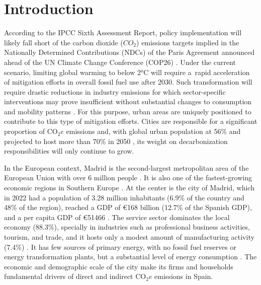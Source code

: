 \documentclass[
  10pt,
  twocolumn]{aft}
\begin{document}
\makeatother
\section{Introduction}\label{sec-introduction}

According to the IPCC Sixth Assessment Report, policy implementation
will likely fall short of the carbon dioxide (\(CO_2\)) emissions
targets implied in the Nationally Determined Contributions (NDCs) of the
Paris Agreement announced ahead of the UN Climate Change Conference
(COP26) \citep{ipcc_summary_2022}. Under the current scenario, limiting
global warming to below 2°C will require a~rapid acceleration of
mitigation efforts in overall fossil fuel use after 2030. Such
transformation will require drastic reductions in industry emissions for
which sector-specific interventions may prove insufficient without
substantial changes to consumption and mobility patterns
\citep{ipcc_summary_2023}. For this purpose, urban areas are uniquely
positioned to contribute to this type of mitigation efforts. Cities are
responsible for a significant proportion of \(\text{CO}_2e\) emissions
\citep{ipcc_climate_2023, wiedmann_city_2021, hoornweg_cities_2011} and,
with global urban population at 56\% and projected to host more than
70\% in 2050 \citep{un_world_2022}, its weight on decarbonization
responsibilities will only continue to grow.

In the European context, Madrid is the second-largest metropolitan area
of the European Union with over 6 million people
\citep{eurostat_population_2024}. It is also one of the fastest-growing
economic regions in Southern Europe \citep{eurostat_gross_2024}. At the
center is the city of Madrid, which in 2022 had a population of 3.28
million inhabitants (6.9\% of the country and 48\% of the region),
reached a GDP of \euro{}168 billion (12.7\% of the Spanish GDP), and a
per capita GDP of \euro{}51466
\citep{am_areas_2023, amMadridEconomia20232023}. The service sector
dominates the local economy (88.3\%), specially in industries such as
professional business activities, tourism, and trade, and it hosts only
a modest amount of manufacturing activity (7.4\%)
\citep{am_areas_2023, am_estructura_2013, amRoadmapClimateNeutrality2022, amMadridEconomia20232023}.
It has few sources of primary energy, with no fossil fuel reserves or
energy transformation plants, but a substantial level of energy
consumption \citep{perez_methodology_2019}. The economic and demographic
scale of the city make its firms and households fundamental drivers of
direct and indirect \(\text{CO}_2e\) emissions in Spain.
\end{document}
